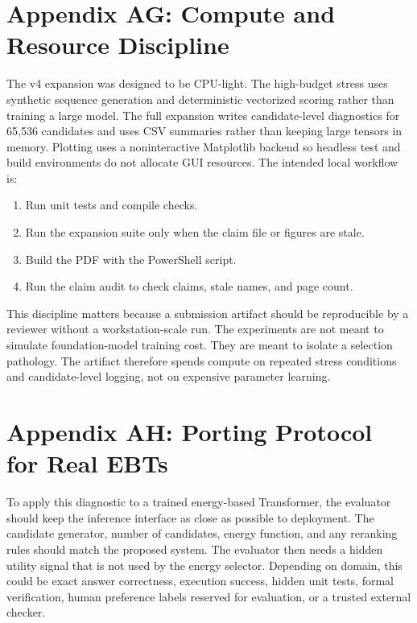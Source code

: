 \documentclass{article}
\begin{document}
\section*{Appendix AG: Compute and Resource Discipline}

The v4 expansion was designed to be CPU-light. The high-budget stress uses
synthetic sequence generation and deterministic vectorized scoring rather than
training a large model. The full expansion writes candidate-level diagnostics
for 65,536 candidates and uses CSV summaries rather than keeping large tensors
in memory. Plotting uses a noninteractive Matplotlib backend so headless test
and build environments do not allocate GUI resources. The intended local
workflow is:

\begin{enumerate}
  \item Run unit tests and compile checks.
  \item Run the expansion suite only when the claim file or figures are stale.
  \item Build the PDF with the PowerShell script.
  \item Run the claim audit to check claims, stale names, and page count.
\end{enumerate}

This discipline matters because a submission artifact should be reproducible
by a reviewer without a workstation-scale run. The experiments are not meant
to simulate foundation-model training cost. They are meant to isolate a
selection pathology. The artifact therefore spends compute on repeated stress
conditions and candidate-level logging, not on expensive parameter learning.

\section*{Appendix AH: Porting Protocol for Real EBTs}

To apply this diagnostic to a trained energy-based Transformer, the evaluator
should keep the inference interface as close as possible to deployment. The
candidate generator, number of candidates, energy function, and any reranking
rules should match the proposed system. The evaluator then needs a hidden
utility signal that is not used by the energy selector. Depending on domain,
this could be exact answer correctness, execution success, hidden unit tests,
formal verification, human preference labels reserved for evaluation, or a
trusted external checker.
\end{document}
